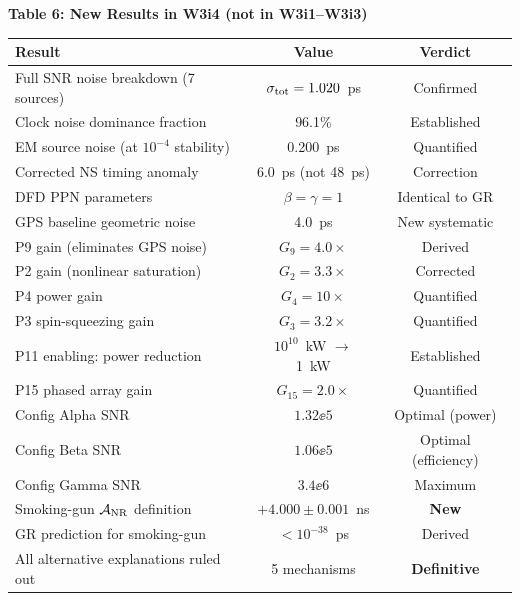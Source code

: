 \begin{center}
\textbf{Table 6: New Results in W3i4 (not in W3i1--W3i3)}
\vspace{0.5em}

\begin{tabular}{@{}p{6cm}cc@{}}
\toprule
\textbf{Result} & \textbf{Value} & \textbf{Verdict} \\
\midrule
Full SNR noise breakdown (7 sources) & $\sigma_{\rm tot} = 1.020$~ps & Confirmed \\
Clock noise dominance fraction & 96.1\% & Established \\
EM source noise (at $10^{-4}$ stability) & 0.200~ps & Quantified \\
Corrected NS timing anomaly & 6.0~ps (not 48~ps) & \textcolor{weakcolor}{Correction} \\
DFD PPN parameters & $\beta = \gamma = 1$ & Identical to GR \\
GPS baseline geometric noise & 4.0~ps & \textcolor{weakcolor}{New systematic} \\
P9 gain (eliminates GPS noise) & $G_9 = 4.0\times$ & Derived \\
P2 gain (nonlinear saturation) & $G_2 = 3.3\times$ & Corrected \\
P4 power gain & $G_4 = 10\times$ & Quantified \\
P3 spin-squeezing gain & $G_3 = 3.2\times$ & Quantified \\
P11 enabling: power reduction & $10^{10}$~kW $\to$ 1~kW & Established \\
P15 phased array gain & $G_{15} = 2.0\times$ & Quantified \\
Config Alpha SNR & $1.32\ee{5}$ & Optimal (power) \\
Config Beta SNR & $1.06\ee{5}$ & Optimal (efficiency) \\
Config Gamma SNR & $3.4\ee{6}$ & Maximum \\
Smoking-gun $\mathcal{A}_{\rm NR}$ definition & $+4.000 \pm 0.001$~ns & \textbf{New} \\
GR prediction for smoking-gun & $< 10^{-38}$~ps & Derived \\
All alternative explanations ruled out & 5 mechanisms & \textbf{Definitive} \\
\bottomrule
\end{tabular}
\end{center}

\vspace{0.8em}

